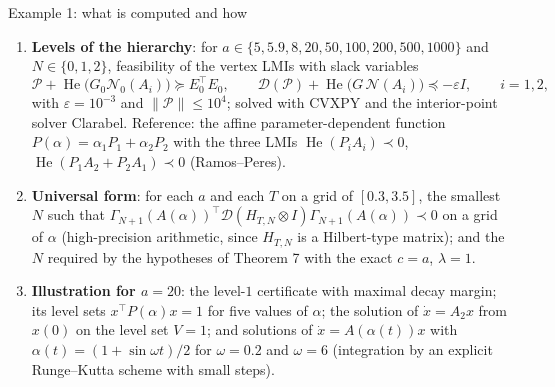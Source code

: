 \documentclass[10pt,aspectratio=169]{beamer}
\newcommand{\tr}{^{\top}}
\newcommand{\PP}{\mathcal{P}}
\newcommand{\DD}{\mathcal{D}}
\newcommand{\NN}{\mathcal{N}}
\DeclareMathOperator{\He}{He}
\begin{document}
\begin{frame}{Example 1: what is computed and how}
\begin{enumerate}
\item \textbf{Levels of the hierarchy}: for $a\in\{5,5.9,8,20,50,100,200,500,1000\}$ and $N\in\{0,1,2\}$, feasibility of the vertex LMIs with slack variables
\[
\PP+\He\big(G_0\NN_0(A_i)\big)\succeq E_0\tr E_0,\qquad \DD(\PP)+\He\big(G\,\NN(A_i)\big)\preceq-\varepsilon I,\qquad i=1,2,
\]
with $\varepsilon=10^{-3}$ and $\|\PP\|\le10^4$; solved with CVXPY and the interior-point solver Clarabel. Reference: the affine parameter-dependent function $P(\alpha)=\alpha_1P_1+\alpha_2P_2$ with the three LMIs $\He(P_iA_i)\prec0$, $\He(P_1A_2+P_2A_1)\prec0$ (Ramos--Peres).
\item \textbf{Universal form}: for each $a$ and each $T$ on a grid of $[0.3,3.5]$, the smallest $N$ such that $\Gamma_{N+1}(A(\alpha))\tr\DD(H_{T,N}\otimes I)\Gamma_{N+1}(A(\alpha))\prec0$ on a grid of $\alpha$ (high-precision arithmetic, since $H_{T,N}$ is a Hilbert-type matrix); and the $N$ required by the hypotheses of Theorem 7 with the exact $c=a$, $\lambda=1$.
\item \textbf{Illustration for $a=20$}: the level-$1$ certificate with maximal decay margin; its level sets $x\tr P(\alpha)x=1$ for five values of $\alpha$; the solution of $\dot x=A_2x$ from $x(0)$ on the level set $V=1$; and solutions of $\dot x=A(\alpha(t))x$ with $\alpha(t)=(1+\sin\omega t)/2$ for $\omega=0.2$ and $\omega=6$ (integration by an explicit Runge--Kutta scheme with small steps).
\end{enumerate}
\end{frame}
\end{document}
